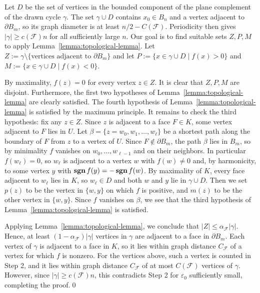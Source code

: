 \documentclass{daj}
\newcommand{\eps}{\varepsilon}
\DeclareMathOperator{\sgn}{\mathop{\bf sgn}}
\begin{document}
Let $D$ be the set of vertices in the bounded component of the plane complement of the drawn cycle $\gamma$. The set $\gamma\cup D$ contains $x_0\in B_n$ and a vertex adjacent to $\partial B_m$, so its graph diameter is at least $n/2-C(\mathcal F)$. Periodicity then gives $|\gamma|\geq c(\mathcal F)n$ for all sufficiently large $n$. Our goal is to find suitable sets $Z, P, M$ to apply Lemma~\ref{lemma:topological-lemma}. Let $Z := \gamma \setminus \{\mbox{vertices adjacent to $\partial B_m$}\}$ and let $P := \{x \in \gamma \cup D \mid f(x) > 0\}$ and $M := \{x \in \gamma \cup D \mid f(x) < 0\}$.

By maximality, $f(z) = 0$ for every vertex $z \in Z$. It is clear that $Z, P, M$ are disjoint. Furthermore, the first two hypotheses of Lemma~\ref{lemma:topological-lemma} are clearly satisfied. The fourth hypothesis of Lemma~\ref{lemma:topological-lemma} is satisfied by the maximum principle. It remains to check the third hypothesis: fix any $z \in Z$. Since $z$ is adjacent to a face $F \in K$, some vertex adjacent to $F$ lies in $U$. Let $\beta = \{z = w_0, w_1, \dots, w_\ell\}$ be a shortest path along the boundary of $F$ from $z$ to a vertex of $U$. Since $F \notin \partial B_m$, the path $\beta$ lies in $B_m$, so by minimality $f$ vanishes on $w_0, \dots, w_{\ell-1}$ and on their neighbors. In particular $f(w_\ell) = 0$, so $w_\ell$ is adjacent to a vertex $w$ with $f(w) \neq 0$ and, by harmonicity, to some vertex $y$ with $\sgn f(y) = -\sgn f(w)$. By maximality of $K$, every face adjacent to $w_\ell$ lies in $K$, so $w_\ell \in D$ and both $w$ and $y$ lie in $\gamma \cup D$. Then we set $p(z)$ to be the vertex in $\{w, y\}$ on which $f$ is positive, and $m(z)$ to be the other vertex in $\{w, y\}$. Since $f$ vanishes on $\beta$, we see that the third hypothesis of Lemma~\ref{lemma:topological-lemma} is satisfied.

Applying Lemma~\ref{lemma:topological-lemma}, we conclude that $|Z| \leq \alpha_{\mathcal{F}} |\gamma|$.
Hence, at least $(1- \alpha_{\mathcal{F}} )|\gamma|$ vertices in $\gamma$ are adjacent to a face in $\partial B_{m}$.
Each vertex of $\gamma$ is adjacent to a face in $K$, so it lies within graph distance $C_{\mathcal F}$ of a vertex for which $f$ is nonzero. For the vertices above, such a vertex is counted in Step 2, and it lies within graph distance $C_{\mathcal F}$ of at most $C(\mathcal F)$ vertices of $\gamma$.
However, since $|\gamma| \geq c(\mathcal F)n$, this contradicts Step 2 for $\eps_0$ sufficiently small, completing the proof.\qed
\end{document}
